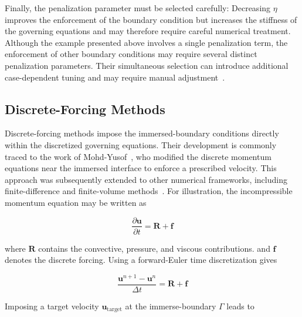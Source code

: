 Finally, the penalization parameter must be selected carefully: Decreasing $\eta$ improves the enforcement of the boundary condition but increases the stiffness of the governing equations and may therefore require careful numerical treatment. Although the example presented above involves a single penalization term, the enforcement of other boundary conditions may require several distinct penalization parameters. Their simultaneous selection can introduce additional case-dependent tuning and may require manual adjustment~\cite{BROWNDYMKOSKI2014344}.

\subsection{Discrete-Forcing Methods}

Discrete-forcing methods impose the immersed-boundary conditions directly within the discretized governing equations. Their development is commonly traced to the work of Mohd-Yusof~\cite{mohd1997combined}, who modified the discrete momentum equations near the immersed interface to enforce a prescribed velocity. This approach was subsequently extended to other numerical frameworks, including finite-difference and finite-volume methods~\cite{fadlun2000combined,KIM2001132}. For illustration, the incompressible momentum equation may be written as

\begin{equation}
    \frac{\partial \boldsymbol{u}}{\partial t}
    =
    \boldsymbol{R}
    +
    \boldsymbol{f}
    \label{eq:discreteForcingMomentum}
\end{equation}

where $\boldsymbol{R}$ contains the convective, pressure, and viscous contributions. and $\boldsymbol{f}$ denotes the discrete forcing. Using a forward-Euler time discretization gives




\begin{equation}
    \frac{\boldsymbol{u}^{n+1}-\boldsymbol{u}^{n}}{\Delta t}
    =
    \boldsymbol{R}
    +
    \boldsymbol{f}
\end{equation}

Imposing a target velocity $\boldsymbol{u}_{\mathrm{target}}$ at the immerse-boundary $\Gamma$  leads to

